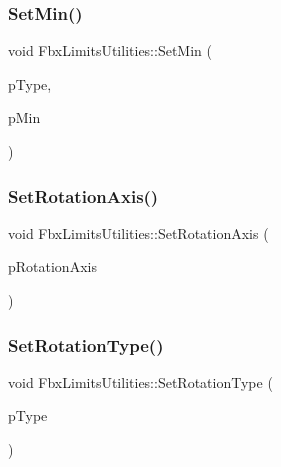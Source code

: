 \mbox{\label{class_fbx_limits_utilities_a27850a4e588581e0130a2634c518665a}} 
\subsubsection{\texorpdfstring{Set\+Min()}{SetMin()}}
{\footnotesize\ttfamily void Fbx\+Limits\+Utilities\+::\+Set\+Min (\begin{DoxyParamCaption}\item[{\hyperlink{class_fbx_limits_utilities_aa55167751039b3d64b56cb7e58f2e62c}{E\+Type}}]{p\+Type,  }\item[{\hyperlink{class_fbx_vector4}{Fbx\+Vector4}}]{p\+Min }\end{DoxyParamCaption})}

\mbox{\label{class_fbx_limits_utilities_a851515616b12ed28516c40767dcc96cb}} 
\subsubsection{\texorpdfstring{Set\+Rotation\+Axis()}{SetRotationAxis()}}
{\footnotesize\ttfamily void Fbx\+Limits\+Utilities\+::\+Set\+Rotation\+Axis (\begin{DoxyParamCaption}\item[{\hyperlink{class_fbx_vector4}{Fbx\+Vector4}}]{p\+Rotation\+Axis }\end{DoxyParamCaption})}

\mbox{\label{class_fbx_limits_utilities_ab756ed1a7da36f3fe871c866a5727265}} 
\subsubsection{\texorpdfstring{Set\+Rotation\+Type()}{SetRotationType()}}
{\footnotesize\ttfamily void Fbx\+Limits\+Utilities\+::\+Set\+Rotation\+Type (\begin{DoxyParamCaption}\item[{\hyperlink{class_fbx_limits_utilities_a8c1ec432e195d91eae2548fbc98c8770}{E\+Rotation\+Type}}]{p\+Type }\end{DoxyParamCaption})}

